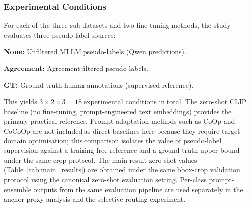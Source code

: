\documentclass{ieeeaccess}
\begin{document}
\subsubsection{Experimental Conditions}

For each of the three sub-datasets and two fine-tuning methods,
the study evaluates three pseudo-label sources:

\noindent\textbf{None:} Unfiltered MLLM pseudo-labels (Qwen predictions).

\noindent\textbf{Agreement:} Agreement-filtered pseudo-labels.

\noindent\textbf{GT:} Ground-truth human annotations (supervised reference).

This yields $3 \times 2 \times 3 = 18$ experimental conditions in total.
The zero-shot CLIP baseline (no fine-tuning,
prompt-engineered text embeddings) provides the primary practical
reference.
Prompt-adaptation methods such as CoOp and CoCoOp are not included as
direct baselines here because they require target-domain optimisation;
this comparison isolates the value of pseudo-label supervision
against a training-free reference and a ground-truth upper bound under
the same crop protocol.
The main-result zero-shot values (Table~\ref{tab:main_results}) are
obtained under the same bbox-crop validation protocol using the
canonical zero-shot evaluation setting.
Per-class prompt-ensemble outputs from the same
evaluation pipeline are used separately in the anchor-proxy
analysis and the selective-routing experiment.

\begin{table}[!ht]
\caption{Seed policy by analysis module.
Main-matrix LP uses repeated-seed evaluation; targeted LoRA
replication is reported for BowTurnHead and TeacherBehavior under None
and GT; auxiliary diagnostics and the remaining LoRA reference cells
remain protocol-matched single-run/fixed-seed analyses.}
\label{tab:seed_policy}
\centering
{}
\end{table}
\end{document}
